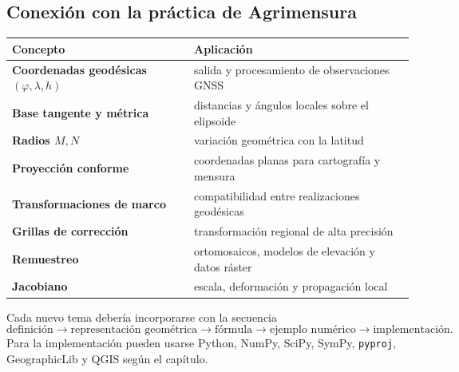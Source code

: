 \subsection{Conexión con la práctica de Agrimensura}

\begin{center}
\begin{tabularx}{\textwidth}{>{\bfseries}p{47mm} X}
\toprule
Concepto & Aplicación\\
\midrule
Coordenadas geodésicas \((\varphi,\lambda,h)\) & salida y procesamiento de observaciones GNSS\\
Base tangente y métrica & distancias y ángulos locales sobre el elipsoide\\
Radios \(M,N\) & variación geométrica con la latitud\\
Proyección conforme & coordenadas planas para cartografía y mensura\\
Transformaciones de marco & compatibilidad entre realizaciones geodésicas\\
Grillas de corrección & transformación regional de alta precisión\\
Remuestreo & ortomosaicos, modelos de elevación y datos ráster\\
Jacobiano & escala, deformación y propagación local\\
\bottomrule
\end{tabularx}
\end{center}

\begin{idea}
Cada nuevo tema debería incorporarse con la secuencia
\[
\text{definición}\rightarrow
\text{representación geométrica}\rightarrow
\text{fórmula}\rightarrow
\text{ejemplo numérico}\rightarrow
\text{implementación}.
\]
Para la implementación pueden usarse Python, NumPy, SciPy, SymPy, \texttt{pyproj},
GeographicLib y QGIS según el capítulo.
\end{idea}
